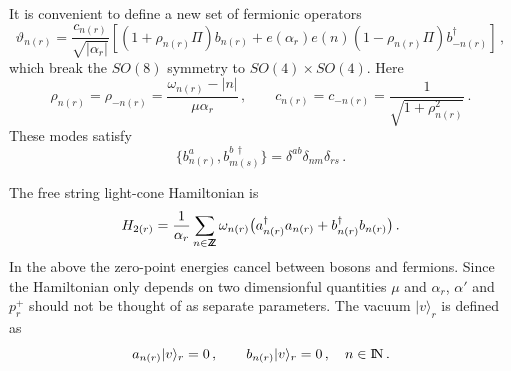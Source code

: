 \documentclass[12pt]{article}
\def\a{\alpha}
\def\d{\delta}
\def\m{\mu}
\def\r{\rho}
\def\o{\omega}
\def\vt{\vartheta}
\def\ra{\rangle}
\def\dg{\dagger}
\numberwithin{equation}{section} \setlength{\textwidth}{17cm}
\def\Zop{\bbbz}
\def\Nop{\bbbn}
\def\bbbz {{\sf Z\!\!Z}}
\def\bbbn {{\rm I\!N}}
\begin{document}
It is convenient to define a new set of fermionic operators~\cite{sv} 
\begin{equation}
\vt_{n(r)}=\frac{c_{n(r)}}{\sqrt{|\a_r|}}\left[(1+\r_{n(r)}\Pi)b_{n(r)}
+e(\a_r)e(n)(1-\r_{n(r)}\Pi)b_{-n(r)}^{\dg}\right]\,,
\end{equation}
which break the $SO(8)$ symmetry to $SO(4)\times SO(4)$. Here
\begin{equation}
\r_{n(r)}=\r_{-n(r)}=\frac{\o_{n(r)}-|n|}{\m\a_r}\,,\qquad
c_{n(r)}=c_{-n(r)}=\frac{1}{\sqrt{1+\r_{n(r)}^2}}\,.
\end{equation}
These modes satisfy 
\begin{equation}
\{b^a_{n(r)},b^{b\,\dg}_{m(s)}\}=\d^{ab}\d_{nm}\d_{rs}\,.
\end{equation}

\noindent The free string light-cone Hamiltonian is
\begin{equation}
H_{2(r)}=\frac{1}{\a_r}\sum_{n\in\Zop}\o_{n(r)}\bigl(a_{n(r)}^{\dg}a_{n(r)}+b_{n(r)}^{\dg}b_{n(r)}\bigr)\,.
\end{equation}
In the above the zero-point energies cancel between bosons and fermions. 
Since the Hamiltonian only depends on two dimensionful
quantities $\m$ and $\a_r$, $\a'$ and $p^+_r$ should not be
thought of as separate parameters. The vacuum $|v\ra_r$ is defined as
\begin{equation}
a_{n(r)}|v\ra_r=0\,,\qquad b_{n(r)}|v\ra_r=0\,,\quad n\in\Nop\,.
\end{equation}
\end{document}
